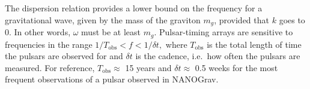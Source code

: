 \documentclass[prd,twocolumn,aps,psfig,nofootinbib,nobibnotes,superscriptaddress,preprintnumbers,times]{revtex4-2}
\begin{document}
The dispersion relation provides a lower bound on the frequency for a gravitational wave, given by the mass of the graviton $m_g$, provided that $k$ goes to 0. In other words, $\omega$ must be at least $m_g$. Pulsar-timing arrays are sensitive to frequencies in the range \cite{Moore:2014lga}
$1/T_{\text{obs}} < f < 1/\delta t,$ where $T_{\text{obs}}$ is the total length of time the pulsars are observed for and $\delta t$ is the cadence, i.e.\ how often the pulsars are measured. For reference, $T_{\text{obs}} \approx$ 15 years and $\delta t \approx$ 0.5 weeks for the most frequent observations of a pulsar observed in NANOGrav. 

\end{document}
